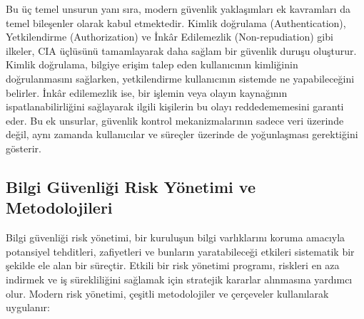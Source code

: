 Bu üç temel unsurun yanı sıra, modern güvenlik yaklaşımları ek kavramları da temel bileşenler olarak kabul etmektedir. Kimlik doğrulama (Authentication), Yetkilendirme (Authorization) ve İnkâr Edilemezlik (Non-repudiation) gibi ilkeler, CIA üçlüsünü tamamlayarak daha sağlam bir güvenlik duruşu oluşturur. Kimlik doğrulama, bilgiye erişim talep eden kullanıcının kimliğinin doğrulanmasını sağlarken, yetkilendirme kullanıcının sistemde ne yapabileceğini belirler. İnkâr edilemezlik ise, bir işlemin veya olayın kaynağının ispatlanabilirliğini sağlayarak ilgili kişilerin bu olayı reddedememesini garanti eder. Bu ek unsurlar, güvenlik kontrol mekanizmalarının sadece veri üzerinde değil, aynı zamanda kullanıcılar ve süreçler üzerinde de yoğunlaşması gerektiğini gösterir.

\subsection{Bilgi Güvenliği Risk Yönetimi ve Metodolojileri}

Bilgi güvenliği risk yönetimi, bir kuruluşun bilgi varlıklarını koruma amacıyla potansiyel tehditleri, zafiyetleri ve bunların yaratabileceği etkileri sistematik bir şekilde ele alan bir süreçtir. Etkili bir risk yönetimi programı, riskleri en aza indirmek ve iş sürekliliğini sağlamak için stratejik kararlar alınmasına yardımcı olur. Modern risk yönetimi, çeşitli metodolojiler ve çerçeveler kullanılarak uygulanır:

